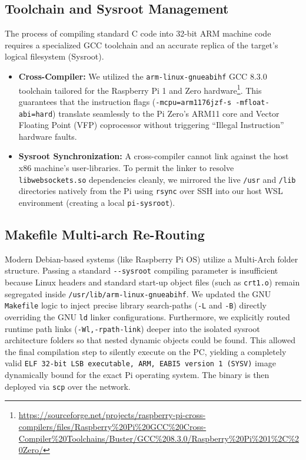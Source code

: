 \documentclass[12pt,a4paper]{article}
\begin{document}
\subsection{Toolchain and Sysroot Management}
The process of compiling standard C code into 32-bit ARM machine code requires a specialized GCC toolchain and an accurate replica of the target's logical filesystem (Sysroot). 
\begin{itemize}
    \item \textbf{Cross-Compiler:} We utilized the \texttt{arm-linux-gnueabihf} GCC 8.3.0 toolchain tailored for the Raspberry Pi 1 and Zero hardware\footnote{\url{https://sourceforge.net/projects/raspberry-pi-cross-compilers/files/Raspberry\%20Pi\%20GCC\%20Cross-Compiler\%20Toolchains/Buster/GCC\%208.3.0/Raspberry\%20Pi\%201\%2C\%20Zero/}}. This guarantees that the instruction flags (\texttt{-mcpu=arm1176jzf-s -mfloat-abi=hard}) translate seamlessly to the Pi Zero's ARM11 core and Vector Floating Point (VFP) coprocessor without triggering ``Illegal Instruction'' hardware faults.
    \item \textbf{Sysroot Synchronization:} A cross-compiler cannot link against the host x86 machine's user-libraries. To permit the linker to resolve \texttt{libwebsockets.so} dependencies cleanly, we mirrored the live \texttt{/usr} and \texttt{/lib} directories natively from the Pi using \texttt{rsync} over SSH into our host WSL environment (creating a local \texttt{pi-sysroot}).
\end{itemize}

\subsection{Makefile Multi-arch Re-Routing}
Modern Debian-based systems (like Raspberry Pi OS) utilize a Multi-Arch folder structure. Passing a standard \texttt{-{}-sysroot} compiling parameter is insufficient because Linux headers and standard start-up object files (such as \texttt{crt1.o}) remain segregated inside \texttt{/usr/lib/arm-linux-gnueabihf}. We updated the GNU \texttt{Makefile} logic to inject precise library search-paths (\texttt{-L} and \texttt{-B}) directly overriding the GNU \texttt{ld} linker configurations. Furthermore, we explicitly routed runtime path links (\texttt{-Wl,-rpath-link}) deeper into the isolated sysroot architecture folders so that nested dynamic objects could be found. This allowed the final compilation step to silently execute on the PC, yielding a completely valid \texttt{ELF 32-bit LSB executable, ARM, EABI5 version 1 (SYSV)} image dynamically bound for the exact Pi operating system. The binary is then deployed via \texttt{scp} over the network.
\end{document}
